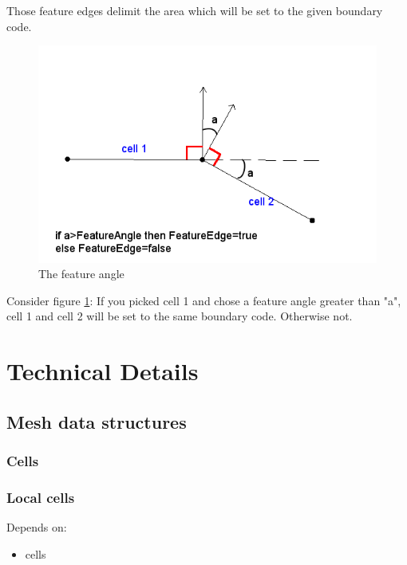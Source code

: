 \documentclass[10pt,a4paper,british]{book}
\begin{document}
Those feature edges delimit the area which will be set to the given boundary code.

\begin{figure}
  \begin{centering}
    \includegraphics[width=14cm]{figures/featureangle4}
    \par
  \end{centering}
  \caption{The feature angle}
  \label{fig:featureangle4}
\end{figure}

Consider figure \ref{fig:featureangle4}: If you picked cell 1 and chose a feature angle greater than "a", cell 1 and cell 2 will be set to the same boundary code. Otherwise not.

\section{Technical Details}

\subsection{Mesh data structures}

\subsubsection{Cells}

\subsubsection{Local cells}
Depends on:
\begin{itemize}
 \item cells
\end{itemize}
\end{document}
